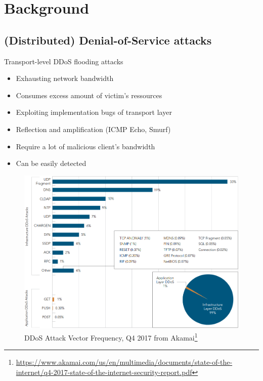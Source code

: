 \documentclass{beamer}
\begin{document}
\section{Background}
\subsection{(Distributed) Denial-of-Service attacks}

\begin{frame}{Transport-level DDoS flooding attacks}
\begin{itemize}
	\item Exhausting network bandwidth
	\item Consumes excess amount of victim's ressources
	\item Exploiting implementation bugs of transport layer
	\item Reflection and amplification (ICMP Echo, Smurf)
	\item Require a lot of malicious client's bandwidth
	\item Can be easily detected
\end{itemize}
\end{frame}

\begin{frame}
	\begin{figure}[t]
    \includegraphics[scale=0.29]{images/akamai2017DDoSAttackVectorFrequency.png}
		\caption{DDoS Attack Vector Frequency, Q4 2017 from Akamai\footnote{\tiny\url{https://www.akamai.com/us/en/multimedia/documents/state-of-the-internet/q4-2017-state-of-the-internet-security-report.pdf}}}
	\end{figure}
\end{frame}
\end{document}
